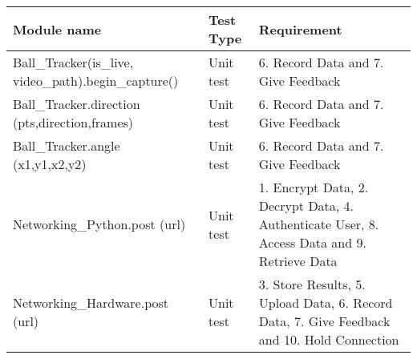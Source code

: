 \begin{tabular}{|p{}|
                p{}|
                p{}|
              }
    \hline 
    \textbf{Module name}                                       & \textbf{Test Type} & \textbf{Requirement}\\
    \hline
    Ball\_Tracker(is\_live, video\_path).begin\_capture()    &  Unit test &  6. Record Data and 7. Give Feedback\\
    \hline 
    Ball\_Tracker.direction (pts,direction,frames)        &  Unit test &  6. Record Data and 7. Give Feedback\\
    \hline 
    Ball\_Tracker.angle (x1,y1,x2,y2)                     &  Unit test &  6. Record Data and 7. Give Feedback\\
    \hline 
    Networking\_Python.post (url)                               &  Unit test &  1. Encrypt Data, 2. Decrypt Data, 4. Authenticate User, 8. Access Data and 9. Retrieve Data\\
    \hline 
    Networking\_Hardware.post (url)                             &  Unit test &  3. Store Results, 5. Upload Data, 6. Record Data, 7. Give Feedback and 10. Hold Connection\\
    \hline 
\end{tabular}